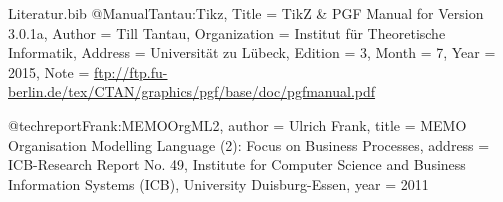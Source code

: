 \begin{filecontents}{Literatur.bib}
@Manual{Tantau:Tikz,
  Title        = {{TikZ \& PGF Manual for Version 3.0.1a}},
  Author       = {Till Tantau}, 
  Organization = {Institut f\"ur Theoretische Informatik},
  Address      = {Universit\"at zu L\"ubeck},
  Edition      = {3},
  Month        = {7},
  Year         = {2015},
  Note         = {\url{ftp://ftp.fu-berlin.de/tex/CTAN/graphics/pgf/base/doc/pgfmanual.pdf}}
}

@techreport{Frank:MEMOOrgML2,
	author = {Ulrich Frank},
	title = {{MEMO Organisation Modelling Language (2): Focus on Business Processes}},
	address = {ICB-Research Report No. 49, Institute for Computer Science and Business Information Systems (ICB), University Duisburg-Essen},
	year = {2011}
}
\end{filecontents}


\documentclass[12pt, a4paper]{article}
\usepackage[ngerman]{babel}
\usepackage[T1]{fontenc}
\usepackage[utf8]{inputenc}
\usepackage{graphicx}
\usepackage{listings}
\usepackage{tikz}
\usepackage{color}
\usepackage[colorlinks=false, pdfborder={0 0 0}]{hyperref}

\usepackage{doc}
\marginparwidth=130.0pt

\usepackage[
    left=5.5cm,
    right=2cm,
    top=2cm,
    bottom=2.5cm,
    includeheadfoot]
{geometry}

\usepackage[round]{natbib}


\usepackage{booktabs}
\usepackage{longtable}
\usepackage{subcaption}
\usepackage{lscape}

\usetikzlibrary{memoorgml}



